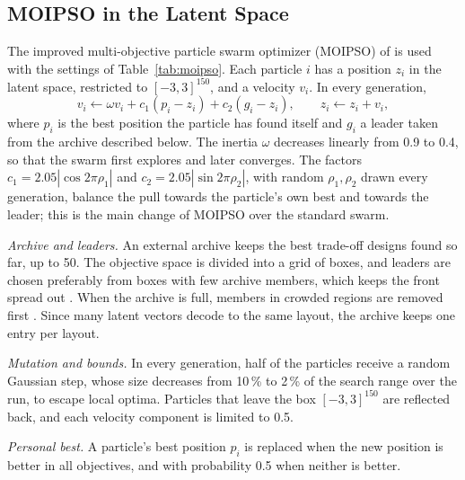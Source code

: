 \documentclass[journal]{IEEEtran}
\begin{document}
\subsection{MOIPSO in the Latent Space}
The improved multi-objective particle swarm optimizer (MOIPSO) of \cite{moipso} is used with the settings of Table~\ref{tab:moipso}. Each particle $i$ has a position $z_i$ in the latent space, restricted to $[-3,3]^{150}$, and a velocity $v_i$. In every generation,
\begin{equation}
v_i\leftarrow\omega v_i+c_1(p_i-z_i)+c_2(g_i-z_i),\qquad z_i\leftarrow z_i+v_i ,
\end{equation}
where $p_i$ is the best position the particle has found itself and $g_i$ a leader taken from the archive described below. The inertia $\omega$ decreases linearly from 0.9 to 0.4, so that the swarm first explores and later converges. The factors $c_1=2.05|\cos2\pi\rho_1|$ and $c_2=2.05|\sin2\pi\rho_2|$, with random $\rho_1,\rho_2$ drawn every generation, balance the pull towards the particle's own best and towards the leader; this is the main change of MOIPSO over the standard swarm.

\emph{Archive and leaders.} An external archive keeps the best trade-off designs found so far, up to 50. The objective space is divided into a grid of boxes, and leaders are chosen preferably from boxes with few archive members, which keeps the front spread out \cite{mopso}. When the archive is full, members in crowded regions are removed first \cite{nsga2}. Since many latent vectors decode to the same layout, the archive keeps one entry per layout.

\emph{Mutation and bounds.} In every generation, half of the particles receive a random Gaussian step, whose size decreases from 10\,\% to 2\,\% of the search range over the run, to escape local optima. Particles that leave the box $[-3,3]^{150}$ are reflected back, and each velocity component is limited to 0.5.

\emph{Personal best.} A particle's best position $p_i$ is replaced when the new position is better in all objectives, and with probability 0.5 when neither is better.
\end{document}
